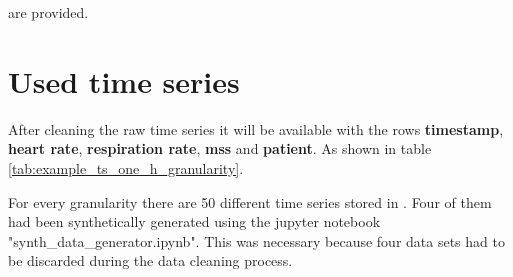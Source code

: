 are provided.



\section{Used time series}
After cleaning the raw time series it will be available with the rows \textbf{timestamp}, \textbf{heart rate}, \textbf{respiration rate}, \textbf{mss} and \textbf{patient}. As shown in table \ref{tab:example_ts_one_h_granularity}.


\begin{table}[h!]
\centering
{}
\caption{Example One hour granularity data}
\label{tab:example_ts_one_h_granularity}
\end{table}

For every granularity there are 50 different time series stored in . Four of them had been synthetically generated using the jupyter notebook "synth\_data\_generator.ipynb". This was necessary because four data sets had to be discarded during the data cleaning process.
